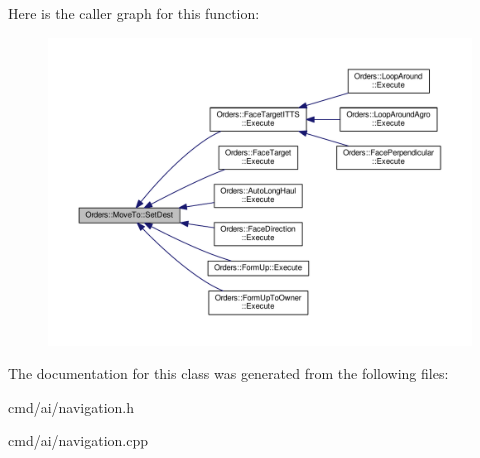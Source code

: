 Here is the caller graph for this function\+:
\nopagebreak
\begin{figure}[H]
\begin{center}
\leavevmode
\includegraphics[width=350pt]{d5/dcc/classOrders_1_1MoveTo_a3828d1174d70a6a9430a699f8e6687c8_icgraph}
\end{center}
\end{figure}




The documentation for this class was generated from the following files\+:\begin{DoxyCompactItemize}
\item 
cmd/ai/navigation.\+h\item 
cmd/ai/navigation.\+cpp\end{DoxyCompactItemize}
